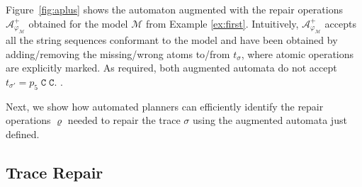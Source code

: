 Figure~\ref{fig:aplus} shows the automaton augmented with the repair operations $\mathcal{A}_{\varphi_{\mathcal{M}}}^+$ obtained for the model $\mathcal{M}$ from Example \ref{ex:first}. Intuitively, $\mathcal{A}_{\varphi_{\mathcal{M}}}^+$ accepts all the string sequences conformant to the model and have been obtained by adding/removing the missing/wrong atoms to/from $t_\sigma$, where atomic operations are explicitly marked. As required, both augmented automata do not accept $t_{\sigma'}=p_5\;\texttt{C}\;\texttt{C}$. . 

Next, we show how automated planners can efficiently identify the repair operations $\varrho$ needed to repair the trace $\sigma$ using the augmented automata just defined.




\subsection{Trace Repair}\label{ssec:trerepair}


